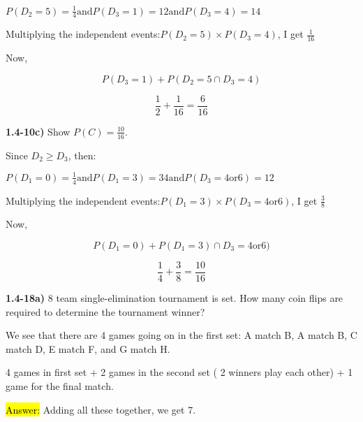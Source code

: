 \documentclass{article}
\begin{document}
$P(D_{2}=5)=\frac{1}{4} \text{and} P(D_{3}=1)={1}{2} \text{and} P(D_{3}=4)={1}{4} $
\vspace{2mm}

Multiplying the independent events:$P(D_{2}=5) \times P(D_{3}=4)$, I get $\frac{1}{16}$ 
\vspace{2mm}

Now, 
\vspace{2mm}

$$P(D_{3}=1)+P(D_{2}=5 \cap D_{3}=4)$$

$$\frac{1}{2}+\frac{1}{16}=\frac{6}{16}$$

\textbf{1.4-10c)}  Show $P(C)=\frac{10}{16}$.
\vspace{2mm}

Since $D_{2} \ge D_{3}$, then:
\vspace{2mm}

$P(D_{1}=0)=\frac{1}{4} \text{and} P(D_{1}=3)={3}{4} \text{and} P(D_{3}=4  \text{or}  6)={1}{2} $

\vspace{2mm}
Multiplying the independent events:$P(D_{1}=3) \times  P(D_{3}=4  \text{or}  6)$, I get $\frac{3}{8}$ 
\vspace{2mm}

Now, 

$$P(D_{1}=0)+P(D_{1}=3) \cap D_{3}=4  \text{or} 6) $$

$$\frac{1}{4}+\frac{3}{8}=\frac{10}{16}$$




\newpage


\textbf{1.4-18a)} 8 team single-elimination tournament is set. How many coin flips are required to determine the tournament winner?

\vspace{2mm}

We see that there are 4 games going on in the first set: A match B, A match B, C match D, E match F, and G match H. 
\vspace{2mm}

4 games in first set + 2 games in the second set ( 2 winners play each other) + 1 game for the final match.

\vspace{2mm}

\hl{Answer:} Adding all these together, we get 7. 

\vspace{5mm}


 
\end{document}
